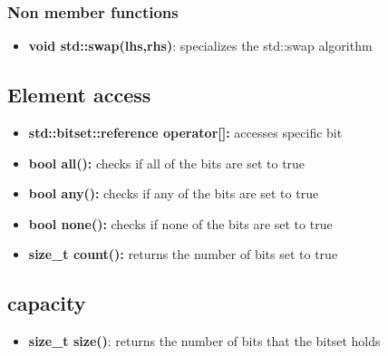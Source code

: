 \documentclass{report}
\begin{document}
        \subsubsection{Non member functions}
        \begin{itemize}
            \item \textbf{void std::swap(lhs,rhs)}: specializes the std::swap algorithm
        \end{itemize}

        \pagebreak 
        \bigbreak \noindent 
        \subsection{Element access}
        \begin{itemize}
            \item \textbf{std::bitset::reference operator[]:} accesses specific bit
            \item \textbf{bool all():} checks if all of the bits are set to true
            \item \textbf{bool any():} checks if any of the bits are set to true
            \item \textbf{bool none():} checks if none of the bits are set to true
            \item \textbf{size\_t count():} returns the number of bits set to true
        \end{itemize}

        \bigbreak \noindent 
        \subsection{capacity}
        \begin{itemize}
            \item \textbf{size\_t size()}: returns the number of bits that the bitset holds
        \end{itemize}

        \bigbreak \noindent 
\end{document}
